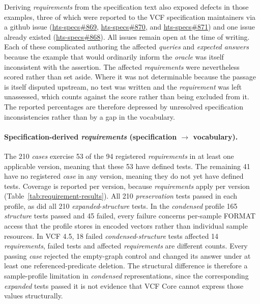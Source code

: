 Deriving \emph{requirements} from the specification text also exposed defects in those examples, three of which were reported to the VCF specification maintainers via a github issue (\href{https://github.com/samtools/hts-specs/issues/869}{hts-specs\#869}, \href{https://github.com/samtools/hts-specs/issues/870}{hts-specs\#870}, and \href{https://github.com/samtools/hts-specs/issues/871}{hts-specs\#871}) and one issue already existed (\href{https://github.com/samtools/hts-specs/issues/868}{hts-specs\#868}). 
All issues remain open at the time of writing.
Each of these complicated authoring the affected \emph{queries} and \emph{expected answers} because the example that would ordinarily inform the \emph{oracle} was itself inconsistent with the assertion.
The affected \emph{requirements} were nevertheless scored rather than set aside.
Where it was not determinable because the passage is itself disputed upstream, no test was written and the \emph{requirement} was left unassessed, which counts against the score rather than being excluded from it.
The reported percentages are therefore depressed by unresolved specification inconsistencies rather than by a gap in the vocabulary.

\paragraph{Specification-derived \emph{requirements} (specification $\rightarrow$ vocabulary).}
The 210 \emph{cases} exercise 53 of the 94 registered \emph{requirements} in at least one applicable version, meaning that these 53 have defined tests. 
The remaining 41 have no registered \emph{case} in any version, meaning they do not yet have defined tests.
Coverage is reported per version, because \emph{requirements} apply per version (Table~\ref{tab:requirement-results}).
All 210 \emph{preservation} tests passed in each profile, as did all 210 \textit{expanded}-\emph{structure} tests.
In the \textit{condensed} profile 165 \emph{structure} tests passed and 45 failed, every failure concerns per-sample FORMAT access that the profile stores in encoded vectors rather than individual sample resources.
In VCF 4.5, 18 failed \textit{condensed}-\emph{structure} tests affected 14 \emph{requirements}, failed tests and affected \emph{requirements} are different counts.
Every passing \emph{case} rejected the empty-graph control and changed its answer under at least one referenced-predicate deletion.
The structural difference is therefore a sample-profile limitation in \textit{condensed} representations, since the corresponding \textit{expanded} tests passed it is not evidence that VCF Core cannot express those values structurally.

